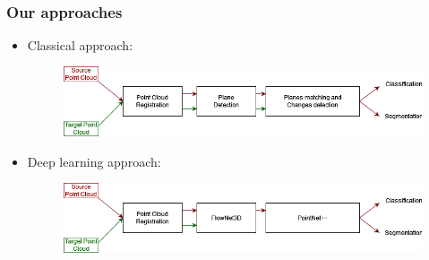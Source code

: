 \documentclass{beamer}
\begin{document}
\begin{frame}[t,allowframebreaks]
\begin{figure}[ht]
\begin{subfigure}{0.48\linewidth}
        \end{subfigure}\\
    \end{figure}
\end{frame}
\begin{frame}[t,allowframebreaks]
    \frametitle{Our approaches}
    \begin{itemize}
        \item Classical approach:
            \begin{figure}
                \centering
                \includegraphics[scale=0.4]{img/approach1.drawio.png}
            \end{figure}
        \item Deep learning approach:
            \begin{figure}
                \centering
                \includegraphics[scale=0.4]{img/approach2.drawio.png}
            \end{figure}
    \end{itemize}
    
    
\end{frame}
\end{document}
